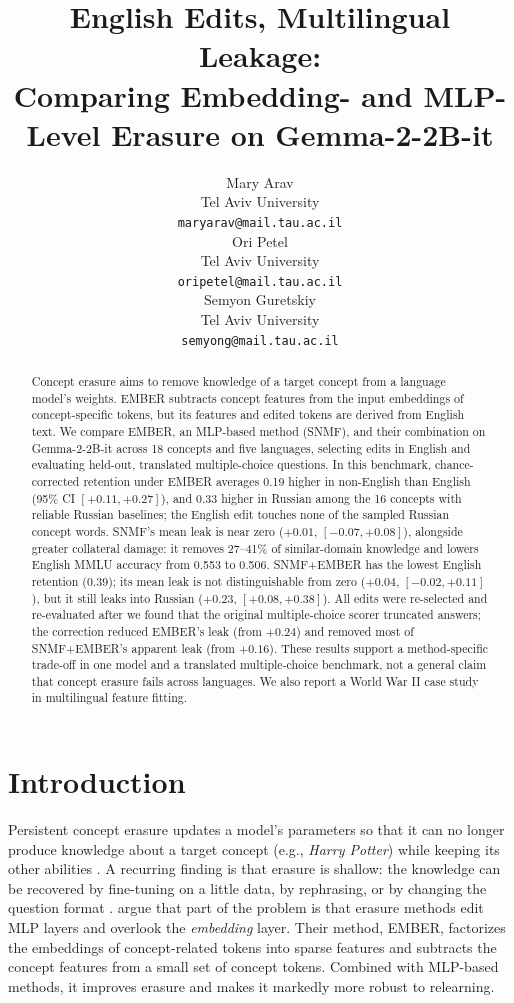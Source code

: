 \documentclass[11pt]{article}
\title{English Edits, Multilingual Leakage:\\
Comparing Embedding- and MLP-Level Erasure on Gemma-2-2B-it}
\author{Mary Arav \\
  Tel Aviv University \\
  \texttt{maryarav@mail.tau.ac.il} \\\And
  Ori Petel \\
  Tel Aviv University \\
  \texttt{oripetel@mail.tau.ac.il} \\\And
  Semyon Guretskiy \\
  Tel Aviv University \\
  \texttt{semyong@mail.tau.ac.il} \\}
\begin{document}
\maketitle

\begin{abstract}
Concept erasure aims to remove knowledge of a target concept from a language model's weights.
EMBER subtracts concept features from the input embeddings of concept-specific tokens, but its features and edited tokens are derived from English text.
We compare EMBER, an MLP-based method (SNMF), and their combination on Gemma-2-2B-it across 18 concepts and five languages, selecting edits in English and evaluating held-out, translated multiple-choice questions.
In this benchmark, chance-corrected retention under EMBER averages 0.19 higher in non-English than English (95\% CI $[+0.11,+0.27]$), and 0.33 higher in Russian among the 16 concepts with reliable Russian baselines; the English edit touches none of the sampled Russian concept words.
SNMF's mean leak is near zero ($+0.01$, $[-0.07,+0.08]$), alongside greater collateral damage: it removes 27--41\% of similar-domain knowledge and lowers English MMLU accuracy from 0.553 to 0.506.
SNMF+EMBER has the lowest English retention ($0.39$); its mean leak is not distinguishable from zero ($+0.04$, $[-0.02,+0.11]$), but it still leaks into Russian ($+0.23$, $[+0.08,+0.38]$).
All edits were re-selected and re-evaluated after we found that the original multiple-choice scorer truncated answers; the correction reduced EMBER's leak (from $+0.24$) and removed most of SNMF+EMBER's apparent leak (from $+0.16$).
These results support a method-specific trade-off in one model and a translated multiple-choice benchmark, not a general claim that concept erasure fails across languages.
We also report a World War II case study in multilingual feature fitting.
\end{abstract}

\section{Introduction}

Persistent concept erasure updates a model's parameters so that it can no longer produce knowledge about a target concept (e.g., \emph{Harry Potter}) while keeping its other abilities \citep{eldan2023harry,li2024wmdp,gurarieh2025precise}.
A recurring finding is that erasure is shallow: the knowledge can be recovered by fine-tuning on a little data, by rephrasing, or by changing the question format \citep{deeb2024unlearning,lynch2024eight,hong2025intrinsic,ye2025formindependent}.
\citet{suslik2026ember} argue that part of the problem is that erasure methods edit MLP layers and overlook the \emph{embedding} layer.
Their method, EMBER, factorizes the embeddings of concept-related tokens into sparse features and subtracts the concept features from a small set of concept tokens.
Combined with MLP-based methods, it improves erasure and makes it markedly more robust to relearning.
\end{document}
